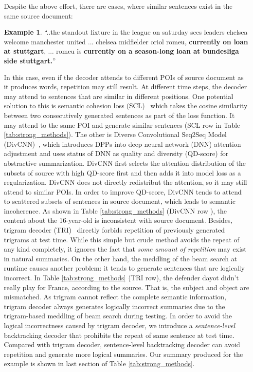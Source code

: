 \documentclass{nle}
\theoremstyle{definition}
\newtheorem{example}{Example}
\newcommand{\tabref}[1]{Table \ref{#1}}
\begin{document}
Despite the above effort, there are cases, where similar sentences 
exist in the same source document:
\begin{example}
	\label{ex:repeatsrc}
	\small{``..the standout fixture in the league on saturday sees leaders 
		chelsea welcome manchester united ... chelsea midfielder oriol romeu, 
		\textbf{currently on loan at stuttgart}, ... romeu is 
		\textbf{currently on a season-long loan at bundesliga side stuttgart.}''} 
\end{example}

In this case, even if the decoder attends to different POIs of 
source document as it produces words, repetition may still result.  
At different time steps, 
the decoder may attend 
to sentences that are similar in different positions.
One potential solution to this is semantic cohesion loss (SCL)~\citep{elikyilmazBHC18}
which takes the cosine similarity between two consecutively generated sentences
as part of the loss function. It may attend to the same POI
and generate similar sentences (SCL row in \tabref{tab:strong_methods}).  
The other is Diverse Convolutional Seq2Seq
Model (DivCNN)~\citep{DivC2C19}, 
which introduces DPPs into deep neural network (DNN) attention adjustment
and uses status of DNN as quality and diversity (QD-score) for abstractive summarization.
DivCNN first selects the attention distribution of the subsets of source with high QD-score
first and then adds it into model loss as a regularization.
DivCNN does not directly redistribut the attention,
so it may still attend to similar POIs.
In order to improve QD-score, DivCNN tends to attend to scattered subsets of sentences in source document,
which leads to semantic incoherence. 
As shown in \tabref{tab:strong_methods} (DivCNN row ),
the content about the 16-year-old 
is inconsistent with source document.
Besides, trigram decoder (TRI)~\citep{PaulusXS17} 
directly forbids repetition of previously generated trigrams at test time. 
While this simple but crude method avoids the repeat of any kind
completely, 
it ignores the fact that \textit{some amount of repetition} may exist
in natural summaries.  
On the other hand, the meddling of the beam search at runtime causes another problem: 
it tends to generate sentences that are logically incorrect. 
In \tabref{tab:strong_methods} (TRI row), the defender dayot didn't
really play for France, according to the source.
That is, the subject and object are mismatched.
As trigram cannot reflect the complete semantic information, 
trigram decoder always generates logically incorrect summaries 
due to the trigram-based meddling of beam search 
during testing. 
In order to avoid the logical incorrectness caused by trigram decoder,
we introduce  a {\em sentence-level} backtracking decoder
that prohibits the repeat of same sentence at test time. 
Compared with trigram decoder, 
sentence-level backtracking decoder can avoid repetition and generate more logical summaries. 
Our summary produced for the example is shown in last section of 
\tabref{tab:strong_methods}.
\end{document}
